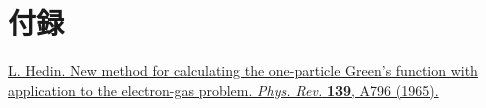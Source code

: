 \documentclass[a4paper,12pt,oneside,openany,uplatex,dvipdfmx]{jsarticle}
\begin{document}
\newpage
\section{付録}\label{sec:suppl}



\newpage
{}
\begin{thebibliography}{99}
    \href{https://journals.aps.org/pr/abstract/10.1103/PhysRev.139.A796}{L. Hedin. New method for calculating the one-particle Green's function with application to the electron-gas problem. {\it Phys. Rev.} {\bf 139}, A796 (1965).} %
   \bibitem{}
   \bibitem{}
   \bibitem{}
\end{thebibliography}
\end{document}
